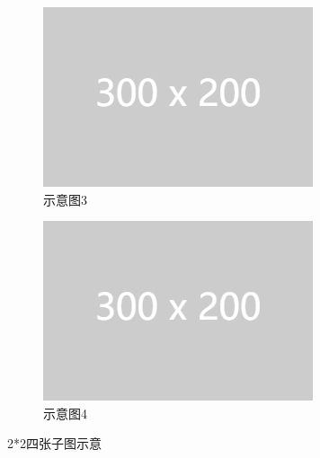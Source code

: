 \documentclass[zihao=-4]{ctexart}
\begin{document}
\begin{spacing}{1.5}
\begin{figure}[htbp]
\begin{subfigure}{0.48\textwidth}
    \includegraphics[width=\linewidth]{example-image-1.png}
    \caption{示意图3} \label{fig:8c}
  \end{subfigure}
  \hspace*{\fill}   %
  \begin{subfigure}{0.48\textwidth}
    \includegraphics[width=\linewidth]{example-image-1.png}
    \caption{示意图4} \label{fig:8d}
  \end{subfigure}
\caption{2*2四张子图示意} \label{fig:8}
\end{figure}



\end{spacing}
\end{document}
